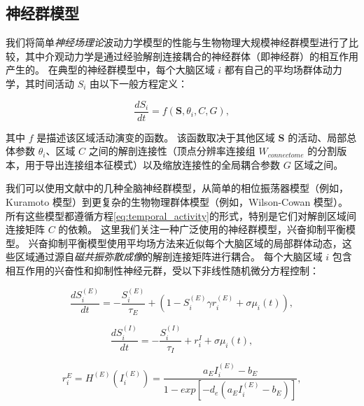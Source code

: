 \documentclass[lang=cn,a4paper,newtx]{elegantpaper}
\begin{document}
\subsection{神经群模型} \label{sec:neural_mass}

我们将简单\textit{神经场理论}波动力学模型的性能与生物物理大规模神经群模型进行了比较，其中介观动力学是通过经验解剖连接耦合的神经群体（即神经群）的相互作用产生的。
在典型的神经群模型中，每个大脑区域 $ i $ 都有自己的平均场群体动力学，其时间活动 $ S_i $ 由以下一般方程定义：

\begin{equation}\label{eq:temporal_activity}
	\frac{dS_i}{dt} = f(\boldsymbol{S}, \theta_i, C, G), 
\end{equation}

其中 $ f $ 是描述该区域活动演变的函数。
该函数取决于其他区域 $ \boldsymbol{S} $ 的活动、局部总体参数 $ \theta_i $、区域 $ C $ 之间的解剖连接性（顶点分辨率连接组 $ W_{connectome} $ 的分割版本，用于导出连接组本征模式）以及缩放连接性的全局耦合参数 $ G $ 区域之间。


我们可以使用文献中的几种全脑神经群模型\cite{sanz2013virtual}，从简单的相位振荡器模型（例如，Kuramoto 模型\cite{breakspear2010generative}）到更复杂的生物物理群体模型（例如，Wilson-Cowan 模型\cite{wilson1972excitatory}）。
所有这些模型都遵循方程\ref{eq:temporal_activity}的形式，特别是它们对解剖区域间连接矩阵 $ C $ 的依赖。
这里我们关注一种广泛使用的神经群模型，兴奋抑制平衡模型\cite{deco2014local,deco2021dynamical,demirtacs2019hierarchical,aquino2022intersection}。
兴奋抑制平衡模型使用平均场方法来近似每个大脑区域的局部群体动态，这些区域通过源自\textit{磁共振弥散成像}的解剖连接矩阵进行耦合。
每个大脑区域 $ i $ 包含相互作用的兴奋性和抑制性神经元群，受以下非线性随机微分方程控制：

\begin{equation}\label{eq:synaptic_gating_E}
	\frac{dS_i^{(E)}}{dt} = - \frac{S_i^{(E)}}{\tau_E} + (1-S_i^{(E)} \gamma r_i^(E) + \sigma \mu_i(t)),
\end{equation}

\begin{equation}\label{eq:synaptic_gating_I}
	\frac{dS_i^{(I)}}{dt} = - \frac{S_i^{(I)}}{\tau_I} + r_i^{I} + \sigma \mu_i(t),
\end{equation}

\begin{equation}\label{eq:firing_rate_E}
	r_i^{E} = H^{(E)} (I_i^{(E)}) = \frac{a_E I_i^{(E)} - b_E}{1 - exp[-d_e (a_E I_i^{(E)} - b_E)]},
\end{equation}
\end{document}
